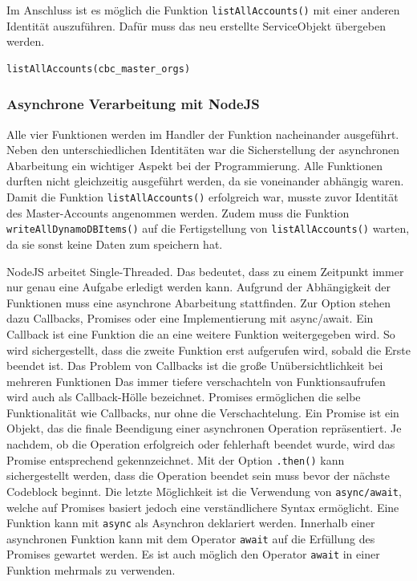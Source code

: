 Im Anschluss ist es möglich die Funktion \verb+listAllAccounts()+ mit einer anderen Identität auszuführen.
Dafür muss das neu erstellte ServiceObjekt übergeben werden.

\begin{lstlisting}[basicstyle=\ttfamily\small, breaklines=true , frame = single, backgroundcolor=\color{lightgray}, caption={Funktionsaufruf mit anderer Identität} ]
    listAllAccounts(cbc_master_orgs)
\end{lstlisting}

\subsubsection{Asynchrone Verarbeitung mit NodeJS}

Alle vier Funktionen werden im Handler der Funktion nacheinander ausgeführt.
Neben den unterschiedlichen Identitäten war die Sicherstellung der asynchronen Abarbeitung ein wichtiger Aspekt bei der Programmierung.
Alle Funktionen durften nicht gleichzeitig ausgeführt werden, da sie voneinander abhängig waren.
Damit die Funktion \verb+listAllAccounts()+ erfolgreich war, musste zuvor Identität des Master-Accounts angenommen werden.
Zudem muss die Funktion \verb+writeAllDynamoDBItems()+ auf die Fertigstellung von \verb+listAllAccounts()+ warten, da sie sonst keine Daten zum speichern hat.

NodeJS arbeitet Single-Threaded.
Das bedeutet, dass zu einem Zeitpunkt immer nur genau eine Aufgabe erledigt werden kann.
Aufgrund der Abhängigkeit der Funktionen muss eine asynchrone Abarbeitung stattfinden.
Zur Option stehen dazu Callbacks, Promises oder eine Implementierung mit async/await.
Ein Callback ist eine Funktion die an eine weitere Funktion weitergegeben wird.
So wird sichergestellt, dass die zweite Funktion erst aufgerufen wird, sobald die Erste beendet ist.
Das Problem von Callbacks ist die große Unübersichtlichkeit bei mehreren Funktionen
Das immer tiefere verschachteln von Funktionsaufrufen wird auch als \glqq Callback-Hölle\grqq{} bezeichnet.
Promises ermöglichen die selbe Funktionalität wie Callbacks, nur ohne die Verschachtelung.
\glqq Ein Promise ist ein Objekt, das die finale Beendigung einer asynchronen Operation repräsentiert.
Je nachdem, ob die Operation erfolgreich oder fehlerhaft beendet wurde, wird das Promise entsprechend gekennzeichnet. \grqq{} \cite[]{Promises}
Mit der Option \verb+.then()+ kann sichergestellt werden, dass die Operation beendet sein muss bevor der nächste Codeblock beginnt.
Die letzte Möglichkeit ist die Verwendung von \verb+async/await+, welche auf Promises basiert jedoch eine verständlichere Syntax ermöglicht.
Eine Funktion kann mit \verb+async+ als Asynchron deklariert werden.
Innerhalb einer asynchronen Funktion kann mit dem Operator \verb+await+ auf die Erfüllung des Promises gewartet werden.
Es ist auch möglich den Operator \verb+await+ in einer Funktion mehrmals zu verwenden.

